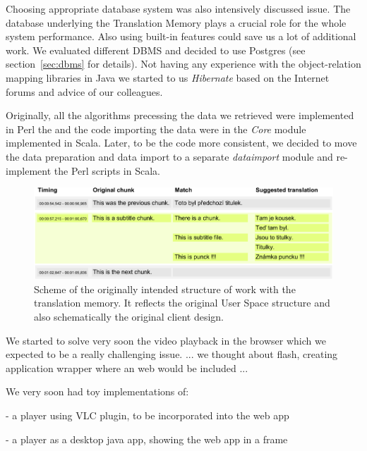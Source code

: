 Choosing appropriate database system was also intensively discussed issue. The database underlying the Translation Memory plays a crucial role for the whole system performance. Also using built-in features could save us a lot of additional work.  We evaluated different DBMS and decided to use Postgres (see section~\ref{sec:dbms} for details). Not having any experience with the object-relation mapping libraries in Java we started to us {\it Hibernate} based on the Internet forums and advice of our colleagues.

Originally, all the algorithms precessing the data we retrieved were implemented in Perl the and the code importing the data were in the \emph{Core} module implemented in Scala. Later, to be the code more consistent, we decided to move the data preparation and data import to a separate \emph{dataimport} module and re-implement the Perl scripts in Scala.

\begin{figure}[h]
\begin{center}
\includegraphics{./figures/original_strucutre.pdf}
\end{center}

\caption{Scheme of the originally intended structure of work with the translation memory. It reflects the original User Space structure and also schematically the original client design.}\label{fig:original_scheme}

\end{figure}

We started to solve very soon the video playback in the browser which we expected to be a really challenging issue. ... we thought about flash, creating application wrapper where an web would be included ...

We very soon had toy implementations of:

- a player using VLC plugin, to be incorporated into the web app

- a player as a desktop java app, showing the web app in a frame

